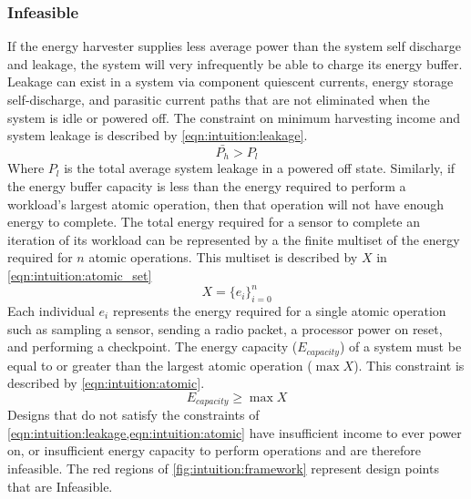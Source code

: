\subsubsection{Infeasible}
If the energy harvester supplies less average power than
the system self discharge and leakage, the system will very infrequently be able to charge its energy buffer.
Leakage can exist in a system via component quiescent currents, energy storage self-discharge, and parasitic current paths that are not eliminated when the system is idle or powered off.
The constraint on minimum harvesting income and system leakage is described by \cref{eqn:intuition:leakage}.
\begin{equation}
    \label{eqn:intuition:leakage}
    \bar{P_h} > P_l
\end{equation}
Where $P_l$ is the total average system leakage in a powered off state.
Similarly, if the energy buffer capacity is less than the
energy required to perform a workload's largest atomic operation,
then that operation will not have enough energy to
complete.
The total energy required for a sensor to complete an iteration of its workload can be represented by a the finite multiset of the energy required for $n$ atomic operations. This multiset is described by $X$ in \cref{eqn:intuition:atomic_set}%
\begin{equation} \label{eqn:intuition:atomic_set}
    X = \{e_i\}_{i=0}^n
\end{equation}
Each individual $e_{i}$ represents the energy required for a single atomic operation such as sampling a sensor,
sending a radio packet, a processor power on reset, and performing a checkpoint.
The energy capacity ($E_{capacity}$) of a system must be equal to or greater than the largest atomic operation ($\max X$).
This constraint is described by  \cref{eqn:intuition:atomic}.
\begin{equation}
    \label{eqn:intuition:atomic}
    E_{capacity} \geq \max X
\end{equation}
Designs that do not satisfy the constraints of \cref{eqn:intuition:leakage,eqn:intuition:atomic} have insufficient income to ever power on, or insufficient energy capacity to perform operations and are
therefore infeasible.
The red regions of \cref{fig:intuition:framework} represent design points that are \textsf{Infeasible}.

